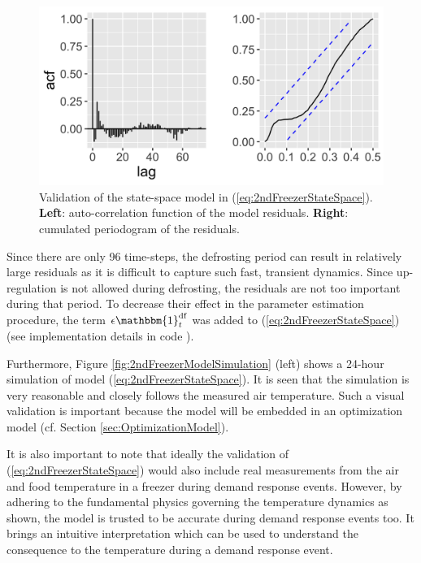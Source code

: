 \begin{figure}[!t]
    \centering
    \includegraphics[width=\columnwidth]{../figures/2ndFreezerModelValidation.png}
    \caption{ Validation of the state-space model in (\ref{eq:2ndFreezerStateSpace}). \textbf{Left}: auto-correlation function of the model residuals. \textbf{Right}: cumulated periodogram of the residuals.}
    \label{fig:2ndFreezerModelValidation}
\end{figure}

Since there are only 96 time-steps, the defrosting period can result in relatively large residuals as it is difficult to capture such fast, transient dynamics. Since up-regulation is not allowed during defrosting, the residuals are not too important during that period. To decrease their effect in the parameter estimation procedure, the term $ \epsilon \mathbbm{1}^{\text{df}}_{t}$ was added to (\ref{eq:2ndFreezerStateSpace}) (see implementation details in code \cite{}).

Furthermore, Figure \ref{fig:2ndFreezerModelSimulation} (left) shows a 24-hour simulation of model (\ref{eq:2ndFreezerStateSpace}). It is seen that the simulation is very reasonable and closely follows the measured air temperature. Such a visual validation is important because the model will be embedded in an optimization model (cf. Section \ref{sec:OptimizationModel}). 

It is also important to note that ideally the validation of (\ref{eq:2ndFreezerStateSpace}) would also include real measurements from the air and food temperature in a freezer during demand response events. However, by adhering to the fundamental physics governing the temperature dynamics as shown, the model is trusted to be accurate during demand response events too. It brings an intuitive interpretation which can be used to understand the consequence to the temperature during a demand response event.


